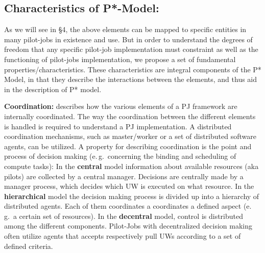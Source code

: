 \documentclass[conference,final]{IEEEtran}
\begin{document}
 

% 
% 


\subsection{Characteristics of P*-Model:}
\label{sec:p_star_elements}

As we will see in \S4, the above elements can be mapped to specific
entities in many pilot-jobs in existence and use.  But in order to
understand the degrees of freedom that any specific pilot-job
implementation must constraint as well as the functioning of
pilot-jobs implementation, we propose a set of fundamental
properties/characteristics. These characteristics are integral
components of the P* Model, in that they describe the interactions
between the elements, and thus aid in the description of P*
model. 


\textbf{Coordination:} describes how the various elements of a PJ framework are
internally coordinated. The way the coordination between the different elements
is handled is required to understand a PJ implementation. A distributed
coordination mechanisms, such as master/worker or a set of distributed software
agents, can be utilized. A property for describing coordination is the point and
process of decision making (e.\,g.\ concerning the binding and scheduling of
compute tasks): In the \textbf{central} model information about available
resources (aka pilots) are collected by a central manager. Decisions are
centrally made by a manager process, which decides which UW is executed on what
resource. In the \textbf{hierarchical} model the decision making process is
divided up into a hierarchy of distributed agents. Each of them coordinates a
coordinates a defined aspect (e.\,g.\ a certain set of resources). In the
\textbf{decentral} model, control is distributed among the different components.
Pilot-Jobs with decentralized decision making often utilize agents that accepts
respectively pull UWs according to a set of defined criteria.
\end{document}
